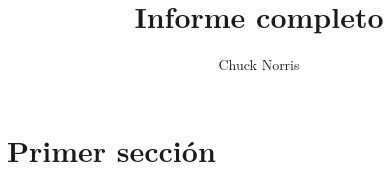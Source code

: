 \documentclass[12pt]{article}
\title{Informe completo}
\author{Chuck Norris}
\begin{document}
\maketitle

\section{Primer sección}
\lipsum[1-20]
\end{document}
